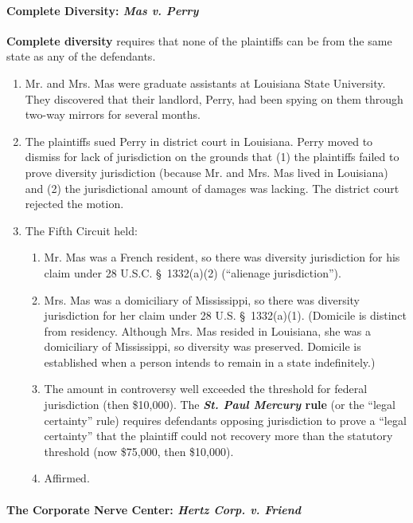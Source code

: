 \paragraph{Complete Diversity: \emph{Mas v. Perry}}

\textbf{Complete diversity} requires that none of the plaintiffs can be from 
the same state as any of the defendants.

\begin{enumerate}
    \item Mr. and Mrs. Mas were graduate assistants at Louisiana State 
    University. They discovered that their landlord, Perry, had been spying on 
    them through two-way mirrors for several months.
    \item The plaintiffs sued Perry in district court in Louisiana. Perry 
    moved to dismiss for lack of jurisdiction on the grounds that (1) the 
    plaintiffs failed to prove diversity jurisdiction (because Mr. and Mrs.  
    Mas lived in Louisiana) and (2) the jurisdictional amount of damages was 
    lacking. The district court rejected the motion.
    \item The Fifth Circuit held:
    \begin{enumerate}
        \item Mr. Mas was a French resident, so there was diversity 
        jurisdiction for his claim under 28 U.S.C. \S\ 1332(a)(2) (``alienage 
        jurisdiction'').
        \item Mrs. Mas was a domiciliary of Mississippi, so there was 
        diversity jurisdiction for her claim under 28 U.S. \S\ 1332(a)(1). 
        (Domicile is distinct from residency. Although Mrs. Mas resided in 
        Louisiana, she was a domiciliary of Mississippi, so diversity was 
        preserved. Domicile is established when a person intends to remain in 
        a state indefinitely.)
        \item The amount in controversy well exceeded the threshold for 
        federal jurisdiction (then \$10,000). The \textbf{\emph{St. Paul 
        Mercury} rule} (or the ``legal certainty'' rule) requires defendants 
        opposing jurisdiction to prove a ``legal certainty'' that the 
        plaintiff could not recovery more than the statutory threshold (now 
        \$75,000, then \$10,000).
        \item Affirmed.
    \end{enumerate}
\end{enumerate}

\paragraph{The Corporate Nerve Center: \emph{Hertz Corp. v. Friend}}

